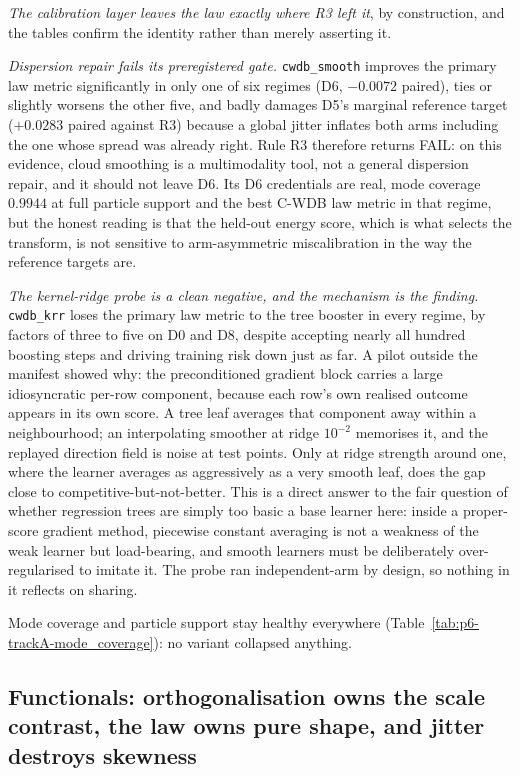 \emph{The calibration layer leaves the law exactly where R3 left it}, by
construction, and the tables confirm the identity rather than merely asserting
it.

\emph{Dispersion repair fails its preregistered gate.} \texttt{cwdb\_smooth}
improves the primary law metric significantly in only one of six regimes (D6,
$-0.0072$ paired), ties or slightly worsens the other five, and badly damages
D5's marginal reference target ($+0.0283$ paired against R3) because a global
jitter inflates both arms including the one whose spread was already right.
Rule R3 therefore returns FAIL: on this evidence, cloud smoothing is a
multimodality tool, not a general dispersion repair, and it should not leave
D6. Its D6 credentials are real, mode coverage $0.9944$ at full particle
support and the best C-WDB law metric in that regime, but the honest reading
is that the held-out energy score, which is what selects the transform, is not
sensitive to arm-asymmetric miscalibration in the way the reference targets
are.

\emph{The kernel-ridge probe is a clean negative, and the mechanism is the
finding.} \texttt{cwdb\_krr} loses the primary law metric to the tree booster
in every regime, by factors of three to five on D0 and D8, despite accepting
nearly all hundred boosting steps and driving training risk down just as far.
A pilot outside the manifest showed why: the preconditioned gradient block
carries a large idiosyncratic per-row component, because each row's own
realised outcome appears in its own score. A tree leaf averages that component
away within a neighbourhood; an interpolating smoother at ridge $10^{-2}$
memorises it, and the replayed direction field is noise at test points. Only
at ridge strength around one, where the learner averages as aggressively as a
very smooth leaf, does the gap close to competitive-but-not-better. This is a
direct answer to the fair question of whether regression trees are simply too
basic a base learner here: inside a proper-score gradient method, piecewise
constant averaging is not a weakness of the weak learner but load-bearing,
and smooth learners must be deliberately over-regularised to imitate it. The
probe ran independent-arm by design, so nothing in it reflects on sharing.

Mode coverage and particle support stay healthy everywhere
(Table~\ref{tab:p6-trackA-mode_coverage}): no variant collapsed anything.

\subsection{Functionals: orthogonalisation owns the scale contrast, the law
owns pure shape, and jitter destroys skewness}
\label{sub:p6-func}

